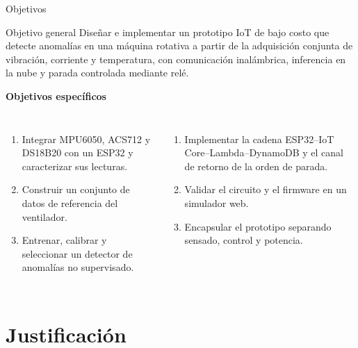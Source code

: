 \documentclass[aspectratio=169]{beamer}
\begin{document}
\begin{frame}{Objetivos}
  \begin{block}{Objetivo general}
    \small
    Diseñar e implementar un prototipo IoT de bajo costo que detecte anomalías en una máquina
    rotativa a partir de la adquisición conjunta de vibración, corriente y temperatura, con
    comunicación inalámbrica, inferencia en la nube y parada controlada mediante relé.
  \end{block}
  \vspace{0.1cm}
  {\small\bfseries\color{verdeosc} Objetivos específicos}
  \vspace{0.05cm}
  \begin{columns}[T]
    \begin{enumerate}\footnotesize
      \item Integrar MPU6050, ACS712 y DS18B20 con un ESP32 y caracterizar sus lecturas.
      \item Construir un conjunto de datos de referencia del ventilador.
      \item Entrenar, calibrar y seleccionar un detector de anomalías no supervisado.
    \end{enumerate}
    \begin{enumerate}\footnotesize
      \setcounter{enumi}{3}
      \item Implementar la cadena ESP32--IoT Core--Lambda--DynamoDB y el canal de retorno de la
            orden de parada.
      \item Validar el circuito y el firmware en un simulador web.
      \item Encapsular el prototipo separando sensado, control y potencia.
    \end{enumerate}
  \end{columns}
\end{frame}

\section{Justificación}
\end{document}
